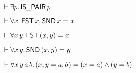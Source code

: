\begin{thmlist}
\item[{\tt PAIR\US EXISTS}] $
\THM \EXISTS p\DOT \CONST{IS\US PAIR} \,p
$
\item[{\tt PAIR}] $
\THM \FORALL x\DOT \CONST{FST} \,x,\CONST{SND} \,x = x
$
\item[{\tt FST}] $
\THM \FORALL x \,y\DOT \CONST{FST} \,(x,y) = x
$
\item[{\tt SND}] $
\THM \FORALL x \,y\DOT \CONST{SND} \,(x,y) = y
$
\item[{\tt PAIR\US EQ}] $
\THM \FORALL x \,y \,a \,b\DOT (x,y = a,b) = (x = a) \AND  (y = b)
$
\end{thmlist}
 

 
